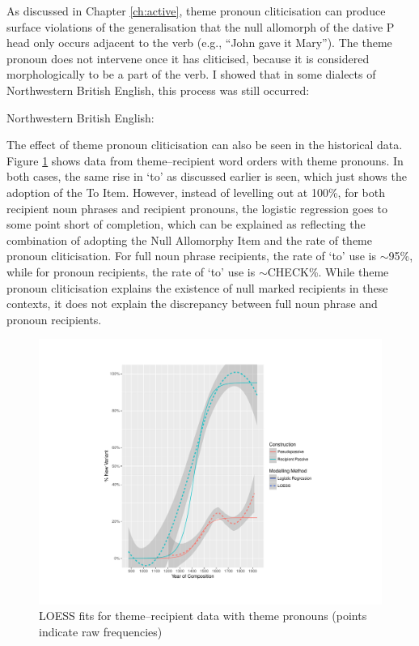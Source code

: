 	As discussed in Chapter \ref{ch:active}, theme pronoun cliticisation can produce surface violations of the generalisation that the null allomorph of the dative P head only occurs adjacent to the verb (e.g., ``John gave it Mary''). The theme pronoun does not intervene once it has cliticised, because it is considered morphologically to be a part of the verb. I showed that in some dialects of Northwestern British English, this process was still occurred:

	\begin{exe}
		 Northwestern British English:
		\begin{xlist}
	\end{xlist}
	\end{exe}

	The effect of theme pronoun cliticisation can also be seen in the historical data. Figure \ref{fig:brit-tr} shows data from theme--recipient word orders with theme pronouns. In both cases, the same rise in `to' as discussed earlier is seen, which just shows the adoption of the To Item. However, instead of levelling out at 100\%, for both recipient noun phrases and recipient pronouns, the logistic regression goes to some point short of completion, which can be explained as reflecting the combination of adopting the Null Allomorphy Item and the rate of theme pronoun cliticisation. For full noun phrase recipients, the rate of `to' use is $\sim$95\%, while for pronoun recipients, the rate of `to' use is $\sim$CHECK\%. While theme pronoun cliticisation explains the existence of null marked recipients in these contexts, it does not explain the discrepancy between full noun phrase and pronoun recipients.

	\begin{figure}[ht!]
		\includegraphics[width=\linewidth]{../images/brit-tp}
		\caption{LOESS fits for theme--recipient data with theme pronouns (points indicate raw frequencies)}
		\label{fig:brit-tr}
	\end{figure}

